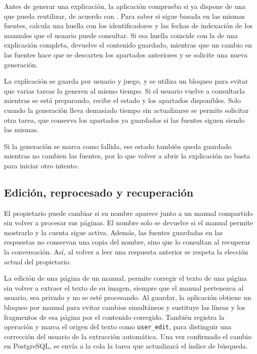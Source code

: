 Antes de generar una explicación, la aplicación comprueba si ya dispone de
una que pueda reutilizar, de acuerdo con . Para saber
si sigue basada en las mismas fuentes, calcula una huella con los
identificadores y las fechas de indexación de los manuales que el usuario
puede consultar. Si esa huella coincide con la de una explicación completa,
devuelve el contenido guardado, mientras que un cambio en las fuentes hace
que se descarten los apartados anteriores y se solicite una nueva generación.

La explicación se guarda por usuario y juego, y se utiliza un bloqueo para
evitar que varias tareas la generen al mismo tiempo. Si el usuario vuelve a
consultarla mientras se está preparando, recibe el estado y los apartados
disponibles. Solo cuando la generación lleva demasiado tiempo sin
actualizarse se permite solicitar otra tarea, que conserva los apartados
ya guardados si las fuentes siguen siendo las mismas.

Si la generación se marca como fallida, ese estado también queda guardado
mientras no cambien las fuentes, por lo que volver a abrir la explicación
no basta para iniciar otro intento.


\FloatBarrier
\subsection{Edición, reprocesado y recuperación}

El propietario puede cambiar si su nombre aparece junto a un manual
compartido sin volver a procesar sus páginas. El nombre solo se devuelve
si el manual permite mostrarlo y la cuenta sigue activa. Además, las
fuentes guardadas en las respuestas no conservan una copia del nombre,
sino que lo consultan al recuperar la conversación. Así, al volver a leer
una respuesta anterior se respeta la elección actual del propietario.

La edición de una página de un manual, permite corregir el texto de
una página sin volver a extraer el texto de su imagen, siempre que el
manual pertenezca al usuario, sea privado y no
se esté procesando. Al guardar, la aplicación obtiene un bloqueo por manual
para evitar cambios simultáneos y sustituye las líneas y los fragmentos de
esa página por el contenido corregido. También registra la operación y
marca el origen del texto como \texttt{user\_\allowbreak{}edit}, para
distinguir una corrección del usuario de la extracción automática. Una vez
confirmado el cambio en PostgreSQL, se envía a la cola la tarea que
actualizará el índice de búsqueda.


